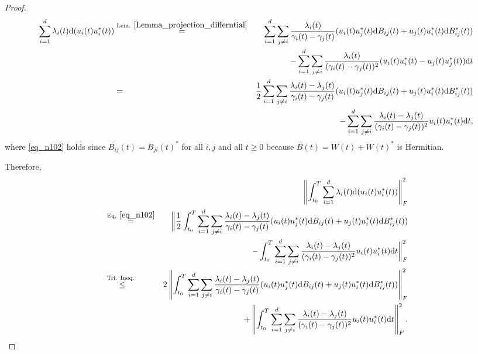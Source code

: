 \documentclass[11pt,letterpaper]{article}
\begin{document}
\begin{proof}

\begin{eqnarray}
 \sum_{i=1}^d   \lambda_i(t) \mathrm{d}( u_i(t) u_i^\ast(t)) &\stackrel{\textrm{Lem. } \ref{Lemma_projection_differntial}}{=}&
%
%
%
 \sum_{i=1}^d     \sum_{j \neq i} \frac{\lambda_i(t)}{\gamma_i(t) - \gamma_j(t)}(u_i(t) u_j^\ast(t)\mathrm{d}B_{ij}(t) + u_j(t) u_i^\ast(t)\mathrm{d}B_{ij}^\ast(t)) \nonumber\\
& & \qquad \qquad  - \sum_{i=1}^d   \sum_{j\neq i} \frac{ \lambda_i(t) }{(\gamma_i(t)- \gamma_j(t))^2} (u_i(t) u_i^\ast(t) - u_j(t)u_j^\ast(t)) \mathrm{d}t \nonumber \\
%
 &=& \frac{1}{2} \sum_{i=1}^d     \sum_{j \neq i} \frac{\lambda_i(t)- \lambda_j(t)}{\gamma_i(t) - \gamma_j(t)}(u_i(t) u_j^\ast(t)\mathrm{d}B_{ij}(t) + u_j(t) u_i^\ast(t)\mathrm{d}B_{ij}^\ast(t)) \nonumber\\
& &  - \sum_{i=1}^d   \sum_{j\neq i} \frac{ \lambda_i(t) - \lambda_j(t) }{(\gamma_i(t)- \gamma_j(t))^2} u_i(t) u_i^\ast(t) \mathrm{d}t  \label{eq_n102},
%
\end{eqnarray}
%
where \eqref{eq_n102} holds since $B_{ij}(t) = B_{ji}(t)^\ast$ for all $i,j$ and all $t \geq 0$ because $B(t) = W(t) + W(t)^\ast$ is Hermitian.




Therefore,
%
\begin{eqnarray} \label{eq_int_1}
& & \left\|\int_{t_0}^T \sum_{i=1}^d   \lambda_i(t) \mathrm{d}( u_i(t) u_i^\ast(t))\right\|_F^2 \nonumber\\ 
%
 &\stackrel{\textrm{Eq. } \eqref{eq_n102}}{=}& \bigg \| \frac{1}{2} \int_{t_0}^T     \sum_{i=1}^d     \sum_{j \neq i} \frac{\lambda_i(t)- \lambda_j(t)}{\gamma_i(t) - \gamma_j(t)}(u_i(t) u_j^\ast(t)\mathrm{d}B_{ij}(t) + u_j(t) u_i^\ast(t)\mathrm{d}B_{ij}^\ast(t))   \nonumber\\
& & \qquad \qquad  -  \int_{t_0}^T \sum_{i=1}^d   \sum_{j\neq i} \frac{ \lambda_i(t) - \lambda_j(t) }{(\gamma_i(t)- \gamma_j(t))^2} u_i(t) u_i^\ast(t) \mathrm{d}t   \bigg\|_F^2\nonumber \\
%
&\stackrel{\textrm{Tri. Ineq. }}{\leq}&  2 \left \| \int_{t_0}^T     \sum_{i=1}^d     \sum_{j \neq i} \frac{\lambda_i(t)- \lambda_j(t)}{\gamma_i(t) - \gamma_j(t)}(u_i(t) u_j^\ast(t)\mathrm{d}B_{ij}(t) + u_j(t) u_i^\ast(t)\mathrm{d}B_{ij}^\ast(t))   \right \|_F^2 \nonumber\\
& & \qquad \qquad  +  \left \|  \int_{t_0}^T \sum_{i=1}^d   \sum_{j\neq i} \frac{ \lambda_i(t) - \lambda_j(t) }{(\gamma_i(t)- \gamma_j(t))^2} u_i(t) u_i^\ast(t) \mathrm{d}t   \right\|_F^2.
\end{eqnarray}



\end{proof}
\end{document}
